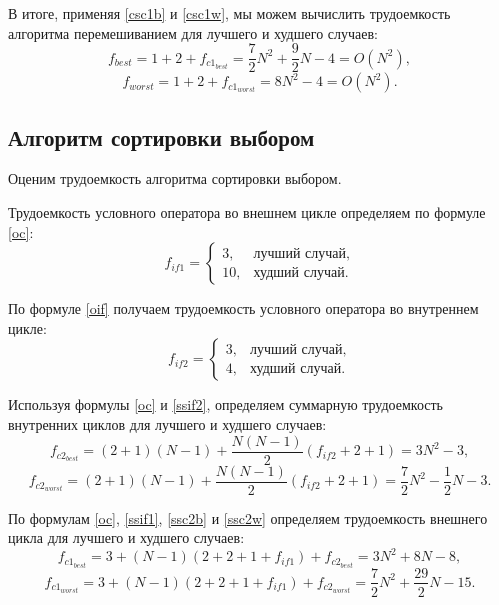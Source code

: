 В итоге, применяя \eqref{csc1b} и \eqref{csc1w}, мы можем вычислить трудоемкость алгоритма перемешиванием для лучшего и худшего случаев:
\begin{equation}\label{csb}
	f_{best} = 1 + 2 + f_{c1_{best}} = \frac{7}{2}N^2 + \frac{9}{2}N - 4 = O(N^2),
\end{equation}
\begin{equation}\label{csw}
	f_{worst} = 1 + 2 + f_{c1_{worst}} = 8N^2 - 4 = O(N^2).
\end{equation}

\subsection{Алгоритм сортировки выбором}

Оценим трудоемкость алгоритма сортировки выбором.

Трудоемкость условного оператора во внешнем цикле определяем по формуле \eqref{oc}:
\begin{equation}\label{ssif1}
	f_{if1} = 
	\begin{cases}
		3, & \text{лучший случай}, \\
		10, & \text{худший случай}.
	\end{cases}
\end{equation}

По формуле \eqref{oif} получаем трудоемкость условного оператора во внутреннем цикле:
\begin{equation}\label{ssif2}
	f_{if2} = 
	\begin{cases}
		3, & \text{лучший случай}, \\
		4, & \text{худший случай}.
	\end{cases}
\end{equation}

Используя формулы \eqref{oc} и \eqref{ssif2}, определяем суммарную трудоемкость внутренних циклов для лучшего и худшего случаев:
\begin{equation}\label{ssc2b}
	f_{c2_{best}} = (2 + 1)(N - 1) + \frac{N(N - 1)}{2}(f_{if2} + 2 + 1) = 3N^2 - 3,
\end{equation}
\begin{equation}\label{ssc2w}
	f_{c2_{worst}} = (2 + 1)(N - 1) + \frac{N(N - 1)}{2}(f_{if2} + 2 + 1) = \frac{7}{2}N^2 - \frac{1}{2}N - 3.
\end{equation}

По формулам \eqref{oc}, \eqref{ssif1}, \eqref{ssc2b} и \eqref{ssc2w} определяем трудоемкость внешнего цикла для лучшего и худшего случаев:
\begin{equation}\label{ssc1b}
	f_{c1_{best}} = 3 + (N - 1)(2 + 2 + 1 + f_{if1}) + f_{c2_{best}} = 3N^2 + 8N - 8,
\end{equation}
\begin{equation}\label{ssc1w}
	f_{c1_{worst}} = 3 + (N - 1)(2 + 2 + 1 + f_{if1}) + f_{c2_{worst}} = \frac{7}{2}N^2 + \frac{29}{2}N - 15.
\end{equation}

